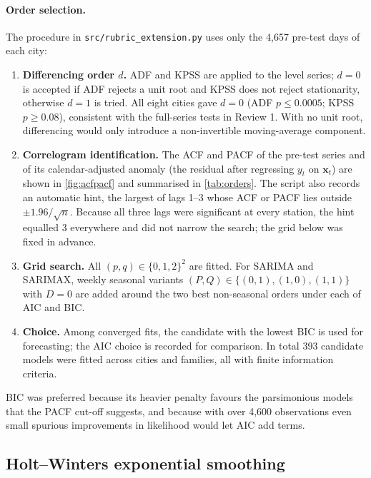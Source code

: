 \documentclass[11pt,a4paper]{article}
\newcommand{\code}[1]{\texttt{#1}}
\begin{document}
\paragraph{Order selection.} The procedure in \code{src/rubric\_extension.py} uses only the 4{,}657 pre-test days of each city:
\begin{enumerate}
  \item \textbf{Differencing order $d$.} ADF and KPSS are applied to the level series; $d = 0$ is accepted if ADF rejects a unit root and KPSS does not reject stationarity, otherwise $d = 1$ is tried. All eight cities gave $d = 0$ (ADF $p \leq 0.0005$; KPSS $p \geq 0.08$), consistent with the full-series tests in Review 1. With no unit root, differencing would only introduce a non-invertible moving-average component.
  \item \textbf{Correlogram identification.} The ACF and PACF of the pre-test series and of its calendar-adjusted anomaly (the residual after regressing $y_t$ on $\mathbf x_t$) are shown in \cref{fig:acfpacf} and summarised in \cref{tab:orders}. The script also records an automatic hint, the largest of lags 1--3 whose ACF or PACF lies outside $\pm 1.96/\sqrt n$. Because all three lags were significant at every station, the hint equalled 3 everywhere and did not narrow the search; the grid below was fixed in advance.
  \item \textbf{Grid search.} All $(p,q) \in \{0,1,2\}^2$ are fitted. For SARIMA and SARIMAX, weekly seasonal variants $(P,Q) \in \{(0,1),(1,0),(1,1)\}$ with $D = 0$ are added around the two best non-seasonal orders under each of AIC and BIC.
  \item \textbf{Choice.} Among converged fits, the candidate with the lowest BIC \citep{schwarz1978estimating} is used for forecasting; the AIC \citep{akaike1974new} choice is recorded for comparison. In total 393 candidate models were fitted across cities and families, all with finite information criteria.
\end{enumerate}
BIC was preferred because its heavier penalty favours the parsimonious models that the PACF cut-off suggests, and because with over 4{,}600 observations even small spurious improvements in likelihood would let AIC add terms.

\subsection{Holt--Winters exponential smoothing}
\end{document}
